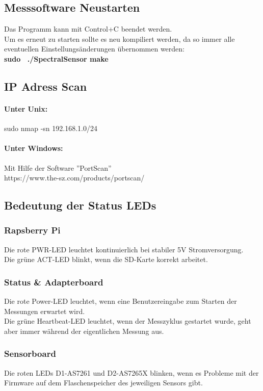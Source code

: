 \subsection{Messsoftware Neustarten}
\label{restart}
Das Programm kann mit Control+C beendet werden.\\
Um es erneut zu starten sollte es neu kompiliert werden, da so immer alle eventuellen Einstellungsänderungen übernommen werden:\\
\textbf{sudo ~./SpectralSensor make}\\




\subsection{IP Adress Scan}
\paragraph{Unter Unix:} sudo nmap -sn 192.168.1.0/24  
\paragraph{Unter Windows:} Mit Hilfe der Software ''PortScan'' \\https://www.the-sz.com/products/portscan/\smallskip

\subsection{Bedeutung der Status LEDs}\label{leds}
\subsubsection{Rapsberry Pi}
Die rote PWR-LED leuchtet kontinuierlich bei stabiler 5V Stromversorgung.\\
Die grüne ACT-LED blinkt, wenn die SD-Karte korrekt arbeitet.
\subsubsection{Status \& Adapterboard}
Die rote Power-LED leuchtet, wenn eine Benutzereingabe zum Starten der Messungen erwartet wird.\\
Die grüne Heartbeat-LED leuchtet, wenn der Messzyklus gestartet wurde, geht aber immer während der eigentlichen Messung aus.
\subsubsection{Sensorboard}
Die roten LEDs D1-AS7261 und D2-AS7265X blinken, wenn es Probleme mit der Firmware auf dem Flaschenspeicher des jeweiligen Sensors gibt.


